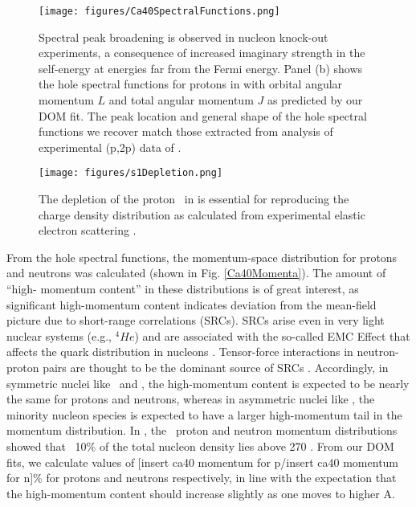 \begin{figure}[tb]
    \centering
    \texttt{[image: figures/Ca40SpectralFunctions.png]}
    \caption[Spectral peak broadening in \caForty: DOM prediction and experimental (p,2p) data]
    {
        Spectral peak broadening is observed in nucleon knock-out experiments, a 
        consequence of increased imaginary strength in the self-energy at energies far from the
        Fermi energy. Panel (b) shows the hole spectral functions for protons in \caForty
        with orbital angular momentum $L$ and total angular momentum $J$ as predicted by our DOM fit.
        The peak location and general shape of the hole spectral functions we recover match those
        extracted from analysis of experimental (p,2p) data of \cite{LiverpoolCa40}.
    }
    \label{Ca40SpectralFunctions}
\end{figure}

\begin{figure}[tb]
    \centering
    \texttt{[image: figures/s1Depletion.png]}
    \caption[Depletion of proton \sOne\ in \caForty essential to reproduce charge density
    distribution]
    {
        The depletion of the proton \sOne\ in \caForty is essential
        for reproducing the charge density
        distribution as calculated from experimental elastic electron scattering \cite{DeVries1987}.
    }
    \label{s1Depletion}
\end{figure}

From the hole spectral functions, the momentum-space distribution for protons and neutrons was
calculated (shown in Fig. \ref{Ca40Momenta}). The amount of ``high-
momentum content'' in these distributions is of great interest, as significant high-momentum content 
indicates deviation from the mean-field picture due to short-range correlations (SRCs). SRCs arise 
even in very light nuclear systems (e.g., $^{4}He$)
and are associated with the so-called EMC Effect that affects the quark distribution in nucleons 
\cite{Hen2012, Arrington2012, CLAS2019}.
Tensor-force interactions in neutron-proton pairs are thought to be the dominant source of 
SRCs \cite{Subedi2008}. Accordingly, in symmetric nuclei like \cTwelve\ and \caForty, the
high-momentum content is expected to be nearly the same for protons and neutrons, whereas in
asymmetric nuclei like \pbEight, the minority nucleon species is expected to have a larger
high-momentum tail in the momentum distribution. In \cite{C12HighMomentum}, the \cTwelve\ proton and
neutron momentum distributions showed that ~10\% of the total nucleon density
lies above 270 \mega\electronvolt{}.
From our DOM fits, we calculate values of [insert ca40 momentum for p/insert ca40 momentum for n]\%
for protons and neutrons respectively, in line with the expectation that the high-momentum content
should increase slightly as one moves to higher A.

